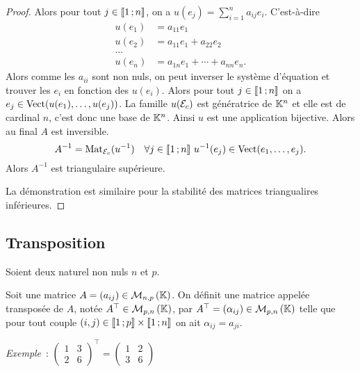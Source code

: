 \begin{proof}
  Alors pour tout \(j \in \mathopen{\llbracket}1\mathclose{}\mathpunct{};n\mathclose{\rrbracket}\), on a \(u(e_j) = \sum_{i=1}^n a_{ij}e_i\). C'est-à-dire
  \begin{align}
    u(e_1) &=a_{11} e_{1} \\
    u(e_2) &=a_{11} e_{1} + a_{22} e_2\\     
    \ldots \\
    u(e_n) &= a_{1n}e_1 + \dotsb + a_{nn}e_n.
  \end{align}
  Alors comme les \(a_{ii}\) sont non nuls, on peut inverser le système d'équation et trouver les \(e_i\) en fonction des \(u(e_i)\). Alors pour tout \(j \in \mathopen{\llbracket}1\mathclose{}\mathpunct{};n\mathclose{\rrbracket}\) on a \(e_j \in \operatorname{Vect}(u(e_1), \ldots, u(e_j))\). La famille \(u(\mathcal{E}_c)\) est génératrice de \(\mathbb{K}^n\) et elle est de cardinal \(n\), c'est donc une base de \(\mathbb{K}^n\). Ainsi \(u\) est une application bijective. Alors au final \(A\) est inversible.
  \begin{equation}
    A^{-1} = \Mat_{\E_c}(u^{-1}) \quad \forall j \in \intervalleentier{1}{n} \ u^{-1}(e_j) \in \VectEngendre(e_1, \ldots, e_j).
  \end{equation}
  Alors \(A^{-1}\) est triangulaire supérieure.

  La démonstration est similaire pour la stabilité des matrices triangualires inférieures.
\end{proof}

\subsection{Transposition}

Soient deux naturel non nuls \(n\) et \(p\).

\begin{defdef}
  Soit une matrice \(A=(a_{ij}) \in \mathcal{M}_{n,p}\left(\mathbb{K}\right)\). On définit une matrice appelée transposée de \(A\), notée \(A^\top \in \mathcal{M}_{p,n}\left(\mathbb{K}\right)\), par \(A^\top=(\alpha_{ij})\in \mathcal{M}_{p,n}\left(\mathbb{K}\right)\) telle que pour tout couple \((i,j) \in \mathopen{\llbracket}1\mathclose{}\mathpunct{};p\mathclose{\rrbracket} \times \mathopen{\llbracket}1\mathclose{}\mathpunct{};n\mathclose{\rrbracket}\) on ait \(\alpha_{ij}=a_{ji}\).
\end{defdef}

\emph{Exemple}~: \(\begin{pmatrix}1 & 3 \\ 2 & 6\end{pmatrix}^\top = \begin{pmatrix}1 & 2 \\ 3 &6\end{pmatrix}\)

